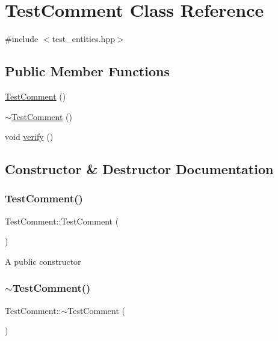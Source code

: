 \hypertarget{class_test_comment}{}\section{Test\+Comment Class Reference}
\label{class_test_comment}


{\ttfamily \#include $<$test\+\_\+entities.\+hpp$>$}

\subsection*{Public Member Functions}
\begin{DoxyCompactItemize}
\item 
\hyperlink{class_test_comment_aa12b638387e03b63fcac02ca5b064b74}{Test\+Comment} ()
\item 
\hyperlink{class_test_comment_af26a10325ebf5c69372b77243dc1bf18}{$\sim$\+Test\+Comment} ()
\item 
void \hyperlink{class_test_comment_a35b7553c77a3922bf0739b8d39073948}{verify} ()
\end{DoxyCompactItemize}


\subsection{Constructor \& Destructor Documentation}
\mbox{\label{class_test_comment_aa12b638387e03b63fcac02ca5b064b74}} 
\subsubsection{\texorpdfstring{Test\+Comment()}{TestComment()}}
{\footnotesize\ttfamily Test\+Comment\+::\+Test\+Comment (\begin{DoxyParamCaption}{ }\end{DoxyParamCaption})}

A public constructor \mbox{\label{class_test_comment_af26a10325ebf5c69372b77243dc1bf18}} 
\subsubsection{\texorpdfstring{$\sim$\+Test\+Comment()}{~TestComment()}}
{\footnotesize\ttfamily Test\+Comment\+::$\sim$\+Test\+Comment (\begin{DoxyParamCaption}{ }\end{DoxyParamCaption})}

